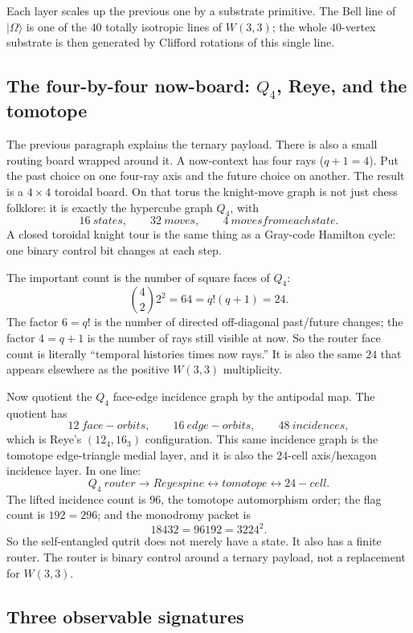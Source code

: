 \documentclass[11pt]{article}
\providecommand{\ket}[1]{|#1\rangle}
\def\text#1{#1}%
\def\cdot{ }%
\begin{document}
Each layer scales up the previous one by a substrate primitive.  The Bell
line of $\ket{\Omega}$ is one of the $40$ totally isotropic lines of
$W(3,3)$; the whole $40$-vertex substrate is then generated by Clifford
rotations of this single line.

\subsection*{The four-by-four now-board: $Q_4$, Reye, and the tomotope}

The previous paragraph explains the ternary payload.  There is also a
small routing board wrapped around it.  A now-context has four rays
($q+1=4$).  Put the past choice on one four-ray axis and the future choice
on another.  The result is a $4\times4$ toroidal board.  On that torus the
knight-move graph is not just chess folklore: it is exactly the hypercube
graph $Q_4$, with
\[
16\ \text{states},\qquad 32\ \text{moves},\qquad 4\ \text{moves from each state}.
\]
A closed toroidal knight tour is the same thing as a Gray-code Hamilton
cycle: one binary control bit changes at each step.

The important count is the number of square faces of $Q_4$:
\[
  \binom{4}{2}2^2 = 6\cdot4 = q!(q+1)=24.
\]
The factor $6=q!$ is the number of directed off-diagonal past/future
changes; the factor $4=q+1$ is the number of rays still visible at now.
So the router face count is literally ``temporal histories times now
rays.''  It is also the same $24$ that appears elsewhere as the positive
$W(3,3)$ multiplicity.

Now quotient the $Q_4$ face-edge incidence graph by the antipodal map.
The quotient has
\[
12\ \text{face-orbits},\qquad 16\ \text{edge-orbits},\qquad 48\ \text{incidences},
\]
which is Reye's $(12_4,16_3)$ configuration.  This same incidence graph is
the tomotope edge-triangle medial layer, and it is also the $24$-cell
axis/hexagon incidence layer.  In one line:
\[
Q_4\ \text{router} \longrightarrow \text{Reye spine}
\longleftrightarrow \text{tomotope} \longleftrightarrow 24\text{-cell}.
\]
The lifted incidence count is $96$, the tomotope automorphism order; the
flag count is $192=2\cdot96$; and the monodromy packet is
\[
  18432 = 96\cdot192 = 32\cdot24^2.
\]
So the self-entangled qutrit does not merely have a state.  It also has a
finite router.  The router is binary control around a ternary payload, not
a replacement for $W(3,3)$.

\subsection*{Three observable signatures}
\end{document}

